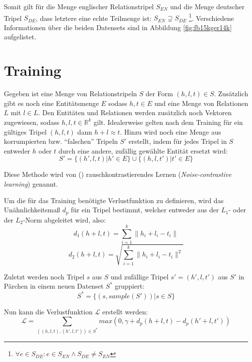 Somit gilt für die Menge englischer Relationstripel $S_{EN}$ und die Menge deutscher Tripel $S_{DE}$, dass letztere
eine echte Teilmenge ist: $S_{EN} \supsetneq S_{DE}$ \footnote{$\forall e \in S_{DE}: e \in S_{EN} \wedge S_{DE} \neq S_{EN}$}.
Verschiedene Informationen über die beiden Datensets sind in Abbildung \ref{fig:fb15kger14k} aufgelistet.

\section{Training}

Gegeben ist eine Menge von Relationstripeln $S$ der Form $(h, l, t) \in S$. Zusätzlich gibt es noch eine Entitätsmenge
$E$ sodass $h, t \in E$ und eine Menge von Relationen $L$ mit $l \in L$. Den Entitäten und Relationen werden zusätzlich
noch Vektoren zugewiesen, sodass $h, l, t \in \mathbb{R}^k$ gilt. Idealerweise gelten nach dem Training für ein gültiges Tripel $(h, l, t)$
dann $h + l \approx t$. Hinzu wird noch eine Menge aus korrumpierten bzw. ``falschen'' Tripeln $S'$ erstellt, indem
für jedes Tripel in $S$ entweder $h$ oder $t$ durch eine andere, zufällig gewählte Entität ersetzt wird:
\begin{equation}
  S' = \{(h', l, t) | h' \in E\} \cup \{(h, l, t') | t' \in E\}
\end{equation}

Diese Methode wird von (\cite{bordes2013translating}) rauschkontrastierendes Lernen (\emph{Noise-contrastive learning})
genannt.

Um die für das Training benötigte Verlustfunktion zu definieren, wird das Unähnlichkeitsmaß $d_p$ für ein Tripel bestimmt, welcher
entweder aus der $L_1$- oder der $L_2$-Norm abgeleitet wird, also:
\begin{equation}
    d_1(h + l, t) = \sum_{i=1}^k \| h_i + l_i - t_i \|
\end{equation}
\begin{equation}
    d_2(h + l, t) = \sqrt{\sum_{i=1}^k \| h_i + l_i - t_i \|^2}
\end{equation}

Zuletzt werden noch Tripel $s$ aus $S$ und zufällige Tripel $s'=(h', l, t')$ aus $S'$ in Pärchen in einem neuen Datenset $S^*$ gruppiert:
\begin{equation}
  S^* = \{(s, sample(S'))| s \in S\}
\end{equation}

Nun kann die Verlustfunktion $\mathcal{L}$ erstellt werden:
\begin{equation}\label{form:lossf}
  \mathcal{L} = \sum_{((h,l,t), (h', l, t')) \in S^*} max(0, \gamma + d_p(h + l, t) - d_p(h' + l, t'))
\end{equation}

